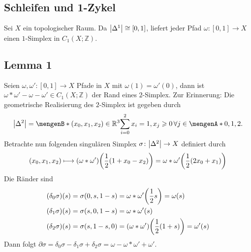 \subsection{Schleifen und 1-Zykel} %
\label{sub:155}
Sei $X$ ein topologischer Raum. Da $\abs*{\Delta^1} \cong [0,1]$, liefert jeder Pfad $\omega \colon [0,1] \to X$ einen $1$-Simplex in $C_1(X;\mathds{Z})$.

\subsection[Lemma 1: Für Pfade $\omega,\omega'$ ist $\omega * \omega' - \omega- \omega'$ der Rand eines $2$-Simplex]{Lemma 1} %
\label{sub:156}
Seien $\omega,\omega' \colon [0,1] \to X$ Pfade in $X$ mit $\omega(1)=\omega'(0)$, dann ist $\omega * \omega' - \omega- \omega' \in C_1(X;\mathds{Z})$ der Rand eines $2$-Simplex.
Zur Erinnerung: Die geometrische Realisierung des $2$-Simplex ist gegeben durch 
\[
	\abs*{\Delta^2} = \set[(x_0,x_1,x_2) \in \mathds{R}^3]{\sum_{i=0}^{2}x_i=1, x_j \ge 0 \,\forall j \in \set{0,1,2}}.
\] 
Betrachte nun folgenden singulären Simplex $\sigma \colon \abs*{\Delta^2} \to X$ definiert durch 
\[
	(x_0,x_1,x_2) \longmapsto(\omega*\omega') \enbrace*{\frac{1}{2} (1+x_0-x_2)} = \omega * \omega' \enbrace*{\frac{1}{2}(2x_0 + x_1) }  
\]
Die Ränder sind
\begin{align*}
	(\delta_0 \sigma)(s) &= \sigma(0,s,1-s) = \omega * \omega' \enbrace*{\frac{1}{2} s}=\omega(s) \\
	(\delta_1 \sigma)(s) &= \sigma(s, 0, 1-s) = \omega * \omega'(s) \\
	(\delta_2 \sigma)(s) &= \sigma(s,1-s,0) = (\omega * \omega') \enbrace*{\frac{1}{2} (1+s)} = \omega'(s)
\end{align*}
Dann folgt $\partial \sigma = \delta_0 \sigma - \delta_1 \sigma + \delta_2 \sigma = \omega - \omega * \omega' + \omega'$. \bewende
\begin{figure}[t]
\end{figure}

